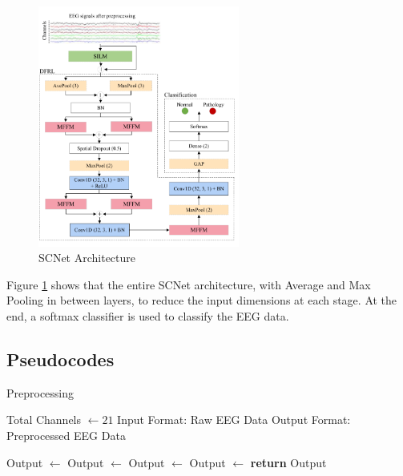 \documentclass[10pt]{article}
\begin{document}
\begin{figure}[H]
    \centering
    \includegraphics[width=0.59\textwidth]{model.png}
    \caption{SCNet Architecture}
    \label{fig:model}
\end{figure}
Figure \ref{fig:model} shows that the entire SCNet architecture, with Average and Max Pooling in between layers, to reduce the input dimensions at each stage. At the end, a softmax classifier is used to classify the EEG data.

\subsection{Pseudocodes}

\begin{algorithm}[H]
  \caption{Preprocessing}
      \begin{algorithmic}[1]
       
          \State Total Channels $\gets 21$
          \State Input Format: Raw EEG Data
          \State 
          \State Output Format: Preprocessed EEG Data
          \State
  
          \State Output $\gets$  
          \State Output $\gets$  
          \State Output $\gets$  
          \State Output $\gets$  
          \State \textbf{return} Output  
      \EndProcedure
      \end{algorithmic}
  \end{algorithm}
\end{document}
